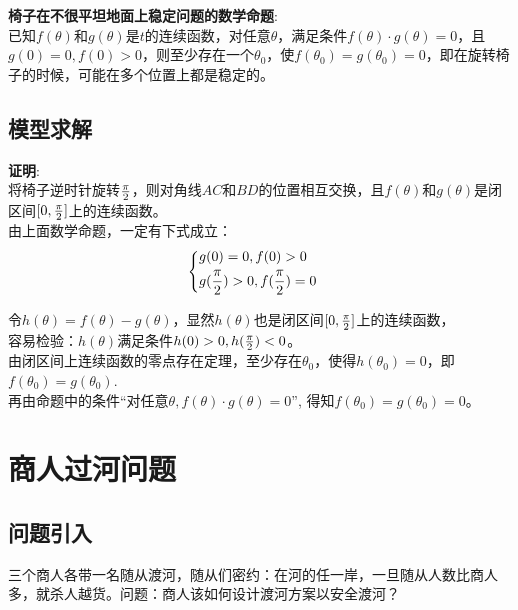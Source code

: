 \documentclass[openany]{progbookcn}
\begin{document}
\textbf{椅子在不很平坦地面上稳定问题的数学命题}:\\
\indent 已知$f(\theta)$和$g(\theta)$是$t$的连续函数，对任意$\theta$，满足条件$f(\theta) \cdot g(\theta)=0$，且$g(0)=0,f(0)>0$，则至少存在一个$\theta_0$，使$f(\theta_0)=g(\theta_0)=0$，即在旋转椅子的时候，可能在多个位置上都是稳定的。

\subsection{模型求解}
\noindent \textbf{证明}:\\
\indent 将椅子逆时针旋转$\pi\over 2$，则对角线$AC$和$BD$的位置相互交换，且$f(\theta)$和$g(\theta)$是闭区间$[0,{\pi \over 2}]$上的连续函数。\\
\indent 由上面数学命题，一定有下式成立：
\begin{equation}
\begin{cases}
\begin{split}
&g(0)=0,f(0)>0\\
&g({\pi \over 2})>0,f({\pi\over 2})=0
\end{split}
\end{cases}
\end{equation}

\indent 令$h(\theta)=f(\theta)-g(\theta)$，显然$h(\theta)$也是闭区间$[0,{\pi\over 2}]$上的连续函数，\\
\indent 容易检验：$h(\theta)$满足条件$h(0)>0,h({\pi\over 2})<0$。\\
\indent 由闭区间上连续函数的零点存在定理，至少存在$\theta_0$，使得$h(\theta_0)=0$，即$f(\theta_0)=g(\theta_0)$.\\
\indent 再由命题中的条件“对任意$\theta,f(\theta)\cdot g(\theta)=0$”,
得知$f(\theta_0)=g(\theta_0)=0$。

\section{商人过河问题}
\subsection{问题引入}
三个商人各带一名随从渡河，随从们密约：在河的任一岸，一旦随从人数比商人多，就杀人越货。问题：商人该如何设计渡河方案以安全渡河？
\end{document}
